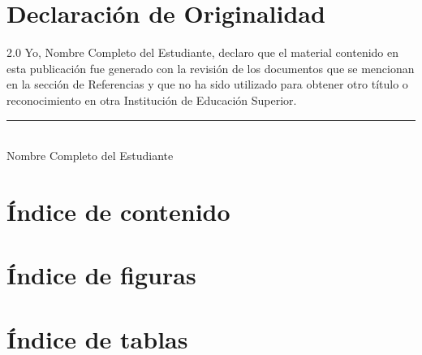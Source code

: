 \documentclass[12pt,letterpaper]{report}
\newcommand{\NombreAutor}{Nombre Completo del Estudiante}
\begin{document}
\setcounter{page}{2}
\hypersetup{pageanchor=true}

\chapter*{Declaración de Originalidad}
\begin{spacing}{2.0}
\noindent Yo, \NombreAutor, declaro que el material contenido en esta publicación fue generado con la revisión de los documentos que se mencionan en la sección de Referencias y que no ha sido utilizado para obtener otro título o reconocimiento en otra Institución de Educación Superior.
\end{spacing}
\begin{center}
\vspace{2cm}
\rule{6cm}{0.4pt}\\
\NombreAutor
\end{center}
\clearpage

\chapter*{Índice de contenido}
\vspace{0.3cm}
\begingroup\setlength{\parskip}{0pt}\makeatletter{}\makeatother\endgroup
\clearpage

\chapter*{Índice de figuras}
\vspace{0.3cm}
\begingroup\setlength{\parskip}{0pt}\makeatletter{}\makeatother\endgroup
\clearpage

\chapter*{Índice de tablas}
\vspace{0.3cm}
\begingroup\setlength{\parskip}{0pt}\makeatletter{}\makeatother\endgroup
\clearpage

\end{document}
